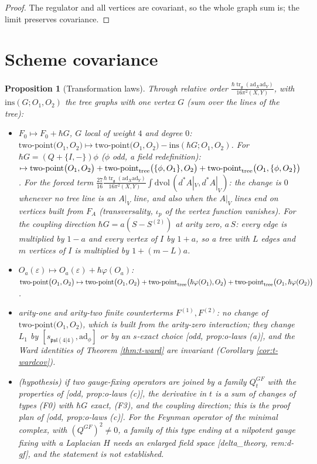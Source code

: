 \documentclass[11pt]{report}
\theoremstyle{plain}
\newtheorem{proposition}[theorem]{Proposition}
\theoremstyle{definition}
\numberwithin{equation}{chapter}
\newcommand{\unit}{\tfrac{\hbar\operatorname{tr}_{\mathfrak g}(\mathrm{ad}_X\mathrm{ad}_Y)}{16\pi^2(X,Y)}}
\newcommand{\TP}[2]{\mathrm{two\mbox{-}point}\big(#1,#2\big)}
\newcommand{\TPz}[2]{\mathrm{two\mbox{-}point}_{\rm tree}\big(#1,#2\big)}
\begin{document}
\begin{proof}
The regulator and all vertices are covariant, so the whole graph sum is; the limit preserves covariance.
\end{proof}

\section{Scheme covariance}
\label{sec:t-scheme}

\begin{proposition}[Transformation laws]
\label{prop:t-laws}
Through relative order $\unit$, with $\mathrm{ins}(G;O_1,O_2)$ the tree graphs with one vertex $G$ (sum over the lines of the tree):
\begin{itemize}
\item[(F0)] $F_0\mapsto F_0+\hbar G$, $G$ local of weight $4$ and degree $0$: $\TP{O_1}{O_2}\mapsto\TP{O_1}{O_2}-\mathrm{ins}(\hbar G;O_1,O_2)$. For $\hbar G=(Q+\{I,-\})\phi$ ($\phi$ odd, a field redefinition): $\mapsto\TP{O_1}{O_2}+\TPz{\{\phi,O_1\}}{O_2}+\TPz{O_1}{\{\phi,O_2\}}$. For the forced term $\tfrac{27}{16}\unit\int\mathrm{dvol}\,(d^*A|_V,d^*A|_V)$: the change is $0$ whenever no tree line is an $A|_V$ line, and also when the $A|_V$ lines end on vertices built from $F_A$ (transversality, $\iota_p$ of the vertex function vanishes). For the coupling direction $\hbar G=a(S-S^{(2)})$ at arity zero, $a\,S$: every edge is multiplied by $1-a$ and every vertex of $I$ by $1+a$, so a tree with $L$ edges and $m$ vertices of $I$ is multiplied by $1+(m-L)a$.
\item[(F3)] $O_a(\varepsilon)\mapsto O_a(\varepsilon)+\hbar\varphi(O_a)$: $\TP{O_1}{O_2}\mapsto\TP{O_1}{O_2}+\TPz{\hbar\varphi(O_1)}{O_2}+\TPz{O_1}{\hbar\varphi(O_2)}$.
\item[(F1/F2)] arity-one and arity-two finite counterterms $F^{(1)},F^{(2)}$: no change of $\TP{O_1}{O_2}$, which is built from the arity-zero interaction; they change $L_1$ by $[s_{\mathfrak{psl}(4|4)},\mathrm{ad}_\phi]$ or by an $s$-exact choice [odd, prop:o-laws (a)], and the Ward identities of Theorem \ref{thm:t-ward} are invariant (Corollary \ref{cor:t-wardcov}).
\item[(gauge)] (hypothesis) if two gauge-fixing operators are joined by a family $Q^{GF}_t$ with the properties of [odd, prop:o-laws (c)], the derivative in $t$ is a sum of changes of types (F0) with $\hbar G$ exact, (F3), and the coupling direction; this is the proof plan of [odd, prop:o-laws (c)]. For the Feynman operator of the minimal complex, with $(Q^{GF})^2\neq0$, a family of this type ending at a nilpotent gauge fixing with a Laplacian $H$ needs an enlarged field space [delta\_theory, rem:d-gf], and the statement is not established.
\end{itemize}
\end{proposition}
\end{document}
